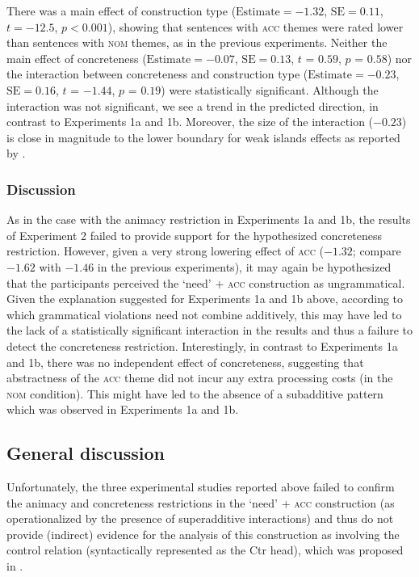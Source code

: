 \documentclass[output=paper,colorlinks,citecolor=brown]{langscibook}
\begin{document}
There was a main effect of construction type ($\text{Estimate} =-1.32$, $\text{SE} =0.11$, $t = -12.5$, $p < 0.001$), showing that sentences with \textsc{acc} themes were rated lower than sentences with \textsc{nom} themes, as in the previous experiments. Neither the main effect of concreteness ($\text{Estimate} =-0.07$, $\text{SE} =0.13$, $t$ = $0.59$, $p$ = $0.58$) nor the interaction between concreteness and construction type ($\text{Estimate} =-0.23$, $\text{SE} =0.16$, $t$ = $-1.44$, $p$ = $0.19$) were statistically significant. Although the interaction was not significant, we see a trend in the predicted direction, in contrast to Experiments 1a and 1b. Moreover, the size of the interaction ($-0.23$) is close in magnitude to the lower boundary for weak islands effects as reported by \citet{Kush.Lohndal.Sprouse2018}.

\subsubsection{Discussion}

As in the case with the animacy restriction in Experiments 1a and 1b, the results of Experiment 2 failed to provide support for the hypothesized concreteness restriction. However, given a very strong lowering effect of \textsc{acc} ($-1.32$; compare $-1.62$ with $-1.46$ in the previous experiments), it may again be hypothesized that the participants perceived the `need' + \textsc{acc} construction as ungrammatical. Given the explanation suggested for Experiments 1a and 1b above, according to which grammatical violations need not combine additively, this may have led to the lack of a statistically significant interaction in the results and thus a failure to detect the concreteness restriction. Interestingly, in contrast to Experiments 1a and 1b, there was no independent effect of concreteness, suggesting that abstractness of the \textsc{acc} theme did not incur any extra processing costs (in the \textsc{nom} condition). This might have led to the absence of a subadditive pattern which was observed in Experiments 1a and 1b.

\subsection{General discussion}

Unfortunately, the three experimental studies reported above failed to confirm the animacy and concreteness restrictions in the `need' + \textsc{acc} construction (as operationalized by the presence of superadditive interactions) and thus do not provide (indirect) evidence for the analysis of this construction as involving the control relation (syntactically represented as the Ctr head), which was proposed in .
\end{document}
